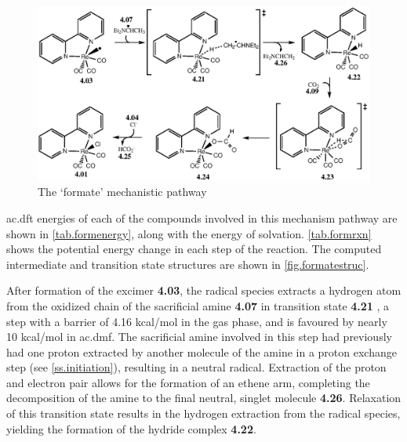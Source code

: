 \begin{figure}[!htb]
 \begin{center}
  \includegraphics[clip=true, width=\textwidth, keepaspectratio]{images/formate.eps}
 \end{center}
\caption{The `formate' mechanistic pathway}
\label{fig.formate}
\end{figure} 

\Gls{ac.dft} energies of each of the compounds involved in this mechanism pathway are shown in \autoref{tab.formenergy}, along with the energy of solvation. \autoref{tab.formrxn} shows the potential energy change in each step of the reaction. The computed intermediate and transition state structures are shown in \autoref{fig.formatestruc}.



After formation of the excimer \textbf{4.03}, the radical species extracts a hydrogen atom from the oxidized chain of the sacrificial amine \textbf{4.07} in transition state \textbf{4.21} , a step with a barrier of 4.16 kcal/mol in the gas phase, and is favoured by nearly 10 kcal/mol in \gls{ac.dmf}. The sacrificial amine involved in this step had previously had one proton extracted by another molecule of the amine in a proton exchange step (see \autoref{ss.initiation}), resulting in a neutral radical. Extraction of the proton and electron pair allows for the formation of an ethene arm, completing the decomposition of the amine to the final neutral, singlet molecule \textbf{4.26}. Relaxation of this transition state results in the hydrogen extraction from the radical species, yielding the formation of the hydride complex \textbf{4.22}.

